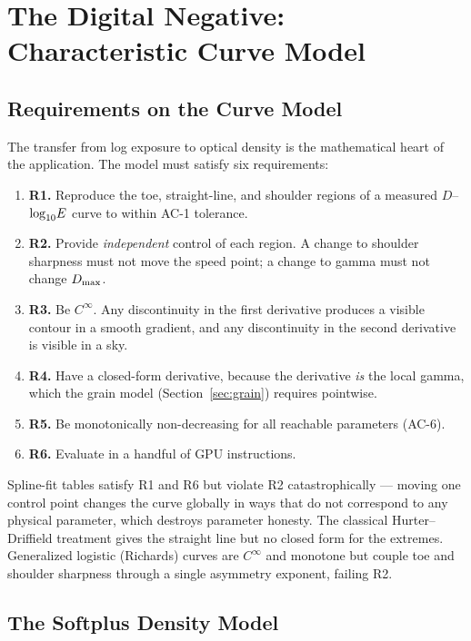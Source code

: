 \section{The Digital Negative: Characteristic Curve Model}
\label{sec:negative}

\subsection{Requirements on the Curve Model}

The transfer from log exposure to optical density is the mathematical heart of
the application. The model must satisfy six requirements:

\begin{enumerate}
\item \textbf{R1.} Reproduce the toe, straight-line, and shoulder regions of a
measured $D$--$\log_{10}\!E$ curve to within AC-1 tolerance.
\item \textbf{R2.} Provide \emph{independent} control of each region. A change
to shoulder sharpness must not move the speed point; a change to gamma must not
change $D_{\max}$.
\item \textbf{R3.} Be $C^\infty$. Any discontinuity in the first derivative
produces a visible contour in a smooth gradient, and any discontinuity in the
second derivative is visible in a sky.
\item \textbf{R4.} Have a closed-form derivative, because the derivative
\emph{is} the local gamma, which the grain model
(Section~\ref{sec:grain}) requires pointwise.
\item \textbf{R5.} Be monotonically non-decreasing for all reachable
parameters (AC-6).
\item \textbf{R6.} Evaluate in a handful of GPU instructions.
\end{enumerate}

Spline-fit tables satisfy R1 and R6 but violate R2 catastrophically --- moving
one control point changes the curve globally in ways that do not correspond to
any physical parameter, which destroys parameter honesty. The classical
Hurter--Driffield treatment \cite{hurter1890,james1977} gives the straight line
but no closed form for the extremes. Generalized logistic (Richards) curves are $C^\infty$ and monotone but
couple toe and shoulder sharpness through a single asymmetry exponent, failing
R2.

\subsection{The Softplus Density Model}

